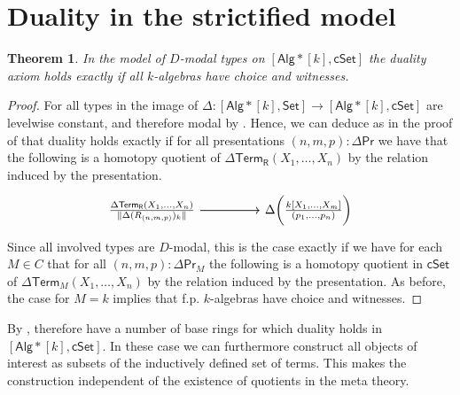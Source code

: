 \documentclass[10pt,a4paper]{article}
\newtheorem{theorem}{Theorem}[section]
\newcommand{\Set}{\mathsf{Set}}
\newcommand{\cSet}{\mathsf{cSet}}
\newcommand{\Alg}{\mathsf{Alg}}
\DeclarePairedDelimiter\paren{(}{)}
\newcommand\R{\mathsf{R}}
\renewcommand\Pr{\mathsf{Pr}}
\newcommand\Term{\mathsf{Term}}
\begin{document}
\section{Duality in the strictified model}\label{sec:duality-in-model-of-modal-types}




\begin{theorem}
  In the model of \(D\)-modal types on \([\Alg*[k], \cSet]\) the duality axiom holds exactly if all \(k\)-algebras have choice and witnesses.
\end{theorem}
\begin{proof}
  For all types in the image of \(\Delta \colon [\Alg*[k], \Set] \to [\Alg*[k], \cSet]\) are levelwise constant, and therefore modal by .
  Hence, we can deduce as in the proof of  that duality holds exactly if for all presentations \((n, m, p) \colon \Delta\Pr\) we have that the following is a homotopy quotient of \(\Delta \Term_\R(X_1, \ldots, X_n)\) by the relation induced by the presentation.
  \[\begin{tikzcd}
    {\frac{\Delta \Term_\R(X_1, \ldots, X_n)}{\trunc{\Delta (R_{(n,m,p)})_k}}} && {\Delta\paren[\bigg]{\frac{k[X_1, \ldots, X_m]}{(p_1, \ldots, p_n)}}}
    \arrow[from=1-1, to=1-3]
    \arrow[from=1-1, to=1-3]
  \end{tikzcd}\]
  Since all involved types are \(D\)-modal, this is the case exactly if we have for each \(M \in C\) that for all \((n, m, p) \colon \Delta \Pr_M\) the following is a homotopy quotient in \(\cSet\) of \(\Delta\Term_M(X_1, \ldots, X_n)\) by the relation induced by the presentation.
  As before, the case for \(M = k\) implies that f.p. \(k\)-algebras have choice and witnesses.
\end{proof}

By , therefore have a number of base rings for which duality holds in \([\Alg*[k], \cSet]\).
In these case we can furthermore construct all objects of interest as subsets of the inductively defined set of terms.
This makes the construction independent of the existence of quotients in the meta theory.
\end{document}
